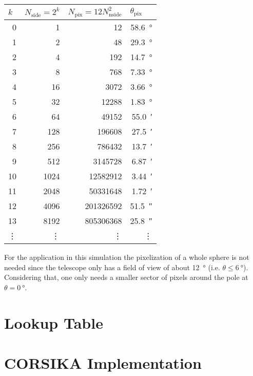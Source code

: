 \begin{center}
\begin{tabular}{r|r|r|r}
\multicolumn{1}{l|}{$k$} & \multicolumn{1}{l|}{$N_\text{side} = 2^k$} & \multicolumn{1}{l|}{$N_\text{pix} = 12N_\text{nside}^2$} & \multicolumn{1}{l}{$\theta_\text{pix}$} \\
\hline
0  & 1    & 12        &  \SI{58.6}{\degree}\\
1  & 2    & 48        &  \SI{29.3}{\degree}\\
2  & 4    & 192       &  \SI{14.7}{\degree}\\
3  & 8    & 768 	  &  \SI{7.33}{\degree}\\
4  & 16   & 3072      &  \SI{3.66}{\degree}\\
5  & 32   & 12288     &  \SI{1.83}{\degree}\\
6  & 64   & 49152     &  \SI{55.0}{\arcminute}\\
7  & 128  & 196608    &  \SI{27.5}{\arcminute}\\
8  & 256  & 786432    &  \SI{13.7}{\arcminute}\\
9  & 512  & 3145728   &  \SI{6.87}{\arcminute}\\
10 & 1024 & 12582912  &  \SI{3.44}{\arcminute}\\
11 & 2048 & 50331648  &  \SI{1.72}{\arcminute}\\
12 & 4096 & 201326592 &  \SI{51.5}{\arcsecond}\\
13 & 8192 & 805306368 &  \SI{25.8}{\arcsecond}\\
\vdots & \vdots & \vdots & \vdots \\
\end{tabular}
\end{center}

For the application in this simulation the pixelization of a whole sphere is not needed since the telescope only has a field of view of about \SI{12}{\degree} (i.e. $\theta \leq \SI{6}{\degree}$). Considering that, one only needs a smaller sector of pixels around the pole at $\theta = \SI{0}{\degree}$. 

\section{Lookup Table}

\section{CORSIKA Implementation}
